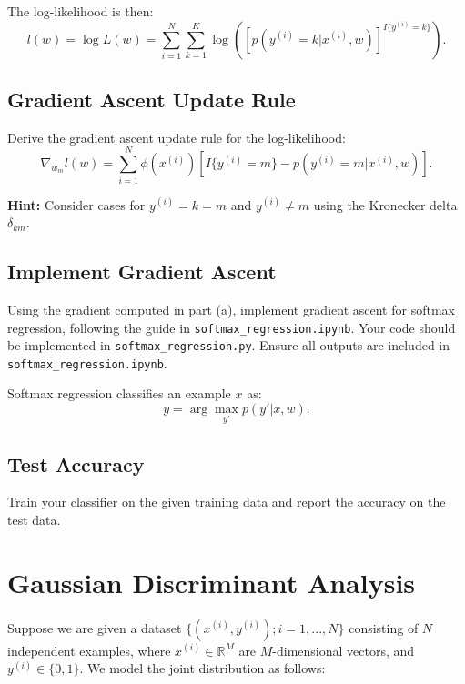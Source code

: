 \documentclass[lang=cn,11pt]{elegantbook}
\begin{document}
The log-likelihood is then:
\begin{equation}
    l(w) = \log L(w) = \sum_{i=1}^{N} \sum_{k=1}^{K} \log \left( \left[ p(y^{(i)} = k|x^{(i)},w) \right]^{I\{y^{(i)}=k\}} \right).
\end{equation}

\subsection{Gradient Ascent Update Rule}

Derive the gradient ascent update rule for the log-likelihood:
\begin{equation}
    \nabla_{w_m} l(w) = \sum_{i=1}^{N} \phi(x^{(i)}) \left[I\{y^{(i)} = m\} - p(y^{(i)} = m | x^{(i)}, w)\right].
\end{equation}

\textbf{Hint:} Consider cases for $y^{(i)} = k = m$ and $y^{(i)} \neq m$ using the Kronecker delta $\delta_{km}$.

\subsection{Implement Gradient Ascent}

Using the gradient computed in part (a), implement gradient ascent for softmax regression, following the guide in \texttt{softmax\_regression.ipynb}. Your code should be implemented in \texttt{softmax\_regression.py}. Ensure all outputs are included in \texttt{softmax\_regression.ipynb}.

Softmax regression classifies an example $x$ as:
\begin{equation}
    y = \arg\max_{y'} p(y'|x,w).
\end{equation}

\subsection{Test Accuracy}

Train your classifier on the given training data and report the accuracy on the test data.



\section{Gaussian Discriminant Analysis}

Suppose we are given a dataset $\{(x^{(i)}, y^{(i)}); i = 1, ..., N\}$ consisting of $N$ independent examples, where $x^{(i)} \in \mathbb{R}^M$ are $M$-dimensional vectors, and $y^{(i)} \in \{0, 1\}$. We model the joint distribution as follows:
\end{document}
